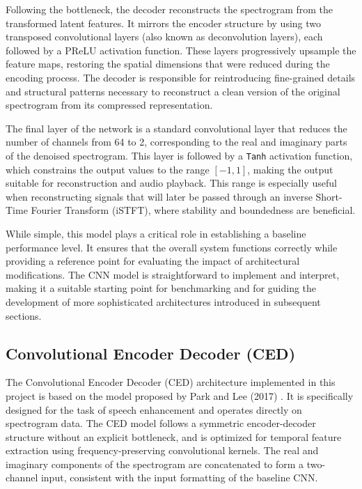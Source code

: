 Following the bottleneck, the decoder reconstructs the spectrogram from the transformed latent features. It mirrors the encoder structure by using two transposed convolutional layers (also known as deconvolution layers), each followed by a PReLU activation function. These layers progressively upsample the feature maps, restoring the spatial dimensions that were reduced during the encoding process. The decoder is responsible for reintroducing fine-grained details and structural patterns necessary to reconstruct a clean version of the original spectrogram from its compressed representation.

The final layer of the network is a standard convolutional layer that reduces the number of channels from 64 to 2, corresponding to the real and imaginary parts of the denoised spectrogram. This layer is followed by a \texttt{Tanh} activation function, which constrains the output values to the range \([-1, 1]\), making the output suitable for reconstruction and audio playback. This range is especially useful when reconstructing signals that will later be passed through an inverse Short-Time Fourier Transform (iSTFT), where stability and boundedness are beneficial.

While simple, this model plays a critical role in establishing a baseline performance level. It ensures that the overall system functions correctly while providing a reference point for evaluating the impact of architectural modifications. The CNN model is straightforward to implement and interpret, making it a suitable starting point for benchmarking and for guiding the development of more sophisticated architectures introduced in subsequent sections.

\subsection{Convolutional Encoder Decoder (CED)}

The Convolutional Encoder Decoder (CED) architecture implemented in this project is based on the model proposed by Park and Lee (2017) \cite{park2017acoustic}. It is specifically designed for the task of speech enhancement and operates directly on spectrogram data. The CED model follows a symmetric encoder-decoder structure without an explicit bottleneck, and is optimized for temporal feature extraction using frequency-preserving convolutional kernels. The real and imaginary components of the spectrogram are concatenated to form a two-channel input, consistent with the input formatting of the baseline CNN.

